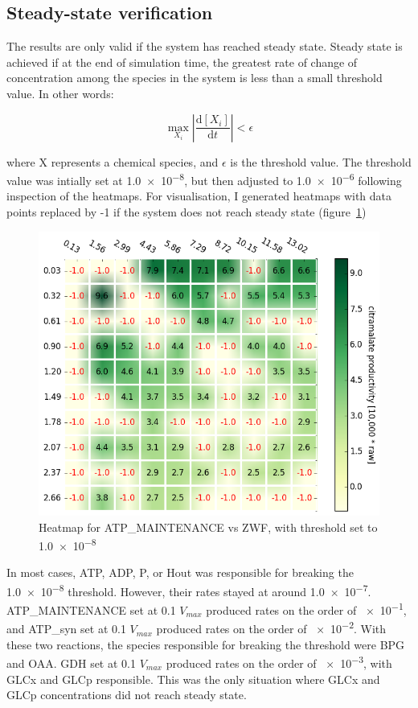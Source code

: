 \documentclass[parskip=full, numbers=noenddot]{scrreprt}
\begin{document}
\subsection{Steady-state verification}
\label{ssec:steadystate}

The results are only valid if the system has reached steady state. Steady state is achieved if at the end of simulation time, the greatest rate of change of concentration among the species in the system is less than a small threshold value. In other words:

\[
  \max_{X_{i}} \left | \frac{\mathrm{d}[X_{i}]}{\mathrm{d}t} \right | < \epsilon
\]

where X represents a chemical species, and $\epsilon$ is the threshold value. The threshold value was intially set at \num{1.0e-8}, but then adjusted to \num{1.0e-6} following inspection of the heatmaps. For  visualisation, I generated heatmaps with data points replaced by -1 if the system does not reach steady state (figure~\ref{fig:steadystate})

\begin{figure}[hbp]
  \centering
  \includegraphics[scale=0.5]{steadystate}
  \caption{Heatmap for ATP\_MAINTENANCE vs ZWF, with threshold set to \num{1.0e-8}}
  \label{fig:steadystate}
\end{figure}

In most cases, ATP, ADP, P, or Hout was responsible for breaking the \num{1.0e-8} threshold. However, their rates stayed at around \num{1.0e-7}. ATP\_MAINTENANCE set at 0.1 $V_{max}$ produced rates on the order of \num{e-1}, and ATP\_syn set at 0.1 $V_{max}$ produced rates on the order of \num{e-2}. With these two reactions, the species responsible for breaking the threshold were BPG and OAA. GDH set at 0.1 $V_{max}$ produced rates on the order of \num{e-3}, with GLCx and GLCp responsible. This was the only situation where GLCx and GLCp concentrations did not reach steady state.
\end{document}

